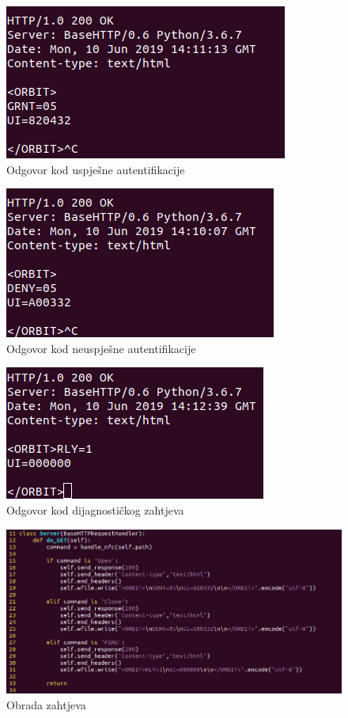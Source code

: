 \documentclass[times, utf8, zavrsni]{fer}
\begin{document}
\begin{figure}[h]
\includegraphics[scale=0.6]{grant.png}
\centering
\caption{Odgovor kod uspješne autentifikacije}
\centering
\end{figure}

\begin{figure}[h]
\includegraphics[scale=0.6]{deny.png}
\centering
\caption{Odgovor kod neuspješne autentifikacije}
\centering
\end{figure}

\begin{figure}[h]
\includegraphics[scale=0.6]{ping.png}
\centering
\caption{Odgovor kod dijagnostičkog zahtjeva}
\centering
\end{figure}

\begin{figure}[H]
\includegraphics[scale=0.5]{server.png}
\centering
\caption{Obrada zahtjeva}
\centering
\end{figure}
\end{document}
